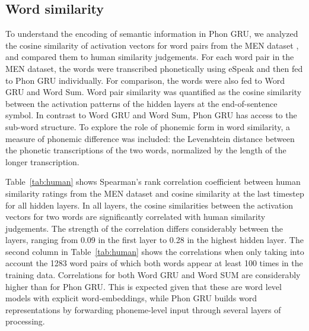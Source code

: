 \subsection{Word similarity}
To understand the encoding of semantic information in {\sc Phon GRU}, we analyzed the cosine similarity of activation vectors for word pairs from the MEN dataset \cite{bruni2014multimodal}, and compared them to human similarity judgements.
For each word pair in the MEN dataset, the words were transcribed phonetically using eSpeak and then fed to {\sc Phon GRU} individually. For comparison, the words were also fed to {\sc Word GRU} and {\sc Word Sum}. Word pair similarity was quantified as the cosine similarity between the activation patterns of the hidden layers at the end-of-sentence symbol.
In contrast to {\sc Word GRU} and {\sc Word Sum}, {\sc Phon GRU} has access to the sub-word structure. To explore the role of phonemic form in word similarity, a measure of phonemic difference was included: the Levenshtein distance between the phonetic transcriptions of the two words, normalized by  the length of the longer transcription. 

Table~\ref{tab:human} shows Spearman's rank correlation coefficient between human similarity ratings from the MEN dataset and cosine similarity at the last timestep for all hidden layers. In all layers, the cosine similarities between the activation vectors for two words are significantly correlated with human similarity judgements. The strength of the correlation differs considerably between the layers, ranging from 0.09 in the first layer to 0.28 in the highest hidden layer. The second column in Table~\ref{tab:human} shows the correlations when only taking into account the 1283 word pairs of which both words appear at least 100 times in the training data. 
Correlations for both {\sc Word GRU} and {\sc Word SUM} are considerably higher than for {\sc Phon GRU}. This is expected given that these are word level models with explicit word-embeddings, while {\sc Phon GRU} builds word representations by forwarding phoneme-level input through several layers of processing.


